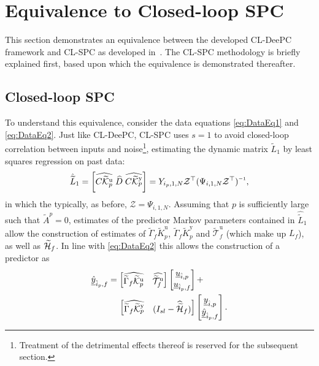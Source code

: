 \section{Equivalence to Closed-loop \acs{SPC}}
This section demonstrates an equivalence between the developed \ac{CL-DeePC} framework and \ac{CL-SPC} as developed in~\cite{Dong2008}. The \ac{CL-SPC} methodology is briefly explained first, based upon which the equivalence is demonstrated thereafter.

\subsection{Closed-loop \ac{SPC}}
To understand this equivalence, consider the data equations \eqref{eq:DataEq1} and \eqref{eq:DataEq2}. Just like \ac{CL-DeePC}, \ac{CL-SPC} uses $s=1$ to avoid closed-loop correlation between inputs and noise\footnote{Treatment of the detrimental effects thereof is reserved for the subsequent section.}, estimating the dynamic matrix $\widetilde{L}_1$ by least squares regression on past data:
\begin{align}\label{eq:CL-SPC-PredMarkov}
\hat{\widetilde{L}}_1 = \left[ \widehat{C\tKp{u}} \; \widehat{D} \; \widehat{C\tKp{y}} \right]=Y_{i_p,1,N}\mathcal{Z}^\top (\Psi_{i,1,N}\mathcal{Z}^\top)\inv,
\end{align}
in which the typically, as before, $\mathcal{Z}=\Psi_{i,1,N}$. Assuming that $p$ is sufficiently large such that $\widetilde{A}^p=0$, estimates of the predictor Markov parameters contained in $\hat{\widetilde{L}}_1$ allow the construction of estimates of $\widetilde{\Gamma}_f\widetilde{K}_p^\mathrm{u}$, $\widetilde{\Gamma}_f\widetilde{K}_p^\mathrm{y}$ and $\widetilde{\mathcal{T}}_f^\mathrm{u}$ (which make up $L_f$), as well as $\widetilde{\mathcal{H}}_f$. In line with \eqref{eq:DataEq2} this allows the construction of a predictor as
\begin{align}\label{eq:CL-SPC-pred1}
	\begin{split}
	\underline{\hat{y}}_{\hat{i}_p,f}&= \begin{bmatrix}\widehat{\widetilde{\Gamma}_f\widetilde{\mathcal{K}}_{p}^{\mathrm{{u}}}} & \widehat{\widetilde{\mathcal{T}}_f^\mathrm{u}} \end{bmatrix} 
	\begin{bmatrix}
		\underline{u}_{\hat{i},p}\\
		\underline{u}_{\hat{i}_p,f}
	\end{bmatrix}+\\
	&\phantom{=}\mkern8mu\begin{bmatrix}
		\widehat{\widetilde{\Gamma}_f\widetilde{\mathcal{K}}_{p}^{\mathrm{{y}}}} & (I_{sl}-\widehat{\widetilde{\mathcal{H}}}_f) \end{bmatrix} 
	\begin{bmatrix}
		\underline{y}_{\hat{i},p}\\
		\underline{\hat{y}}_{\hat{i}_p,f}
	\end{bmatrix}.
	\end{split}
\end{align}
